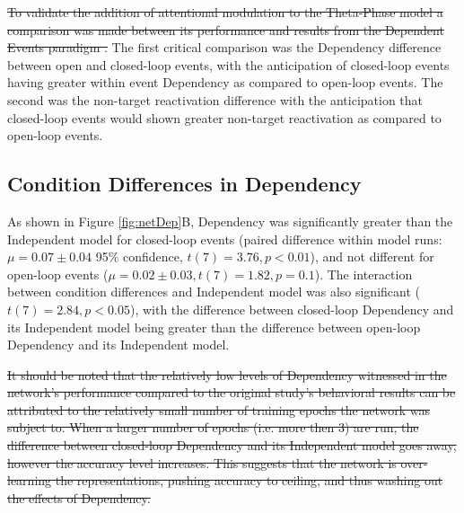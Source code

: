 \documentclass[11pt, titlepage, twoside]{article}
\providecommand{\DIFadd}[1]{{\protect\color{blue}\uwave{#1}}} %
\providecommand{\DIFdel}[1]{{\protect\color{red}\sout{#1}}}                      %
\providecommand{\DIFaddbegin}{} %
\providecommand{\DIFaddend}{} %
\providecommand{\DIFdelbegin}{} %
\providecommand{\DIFdelend}{} %
\begin{document}
\DIFdelbegin \DIFdel{To validate the addition of attentional modulation to the Theta-Phase model a comparison was made between its performance and results from the Dependent Events paradigm%
.  }\DIFdelend The first critical comparison \DIFaddbegin \DIFadd{with behavior }\DIFaddend was the Dependency difference between open and closed-loop events, with the anticipation of closed-loop events having greater within event Dependency as compared to open-loop events.  The second was the non-target reactivation difference with the anticipation that closed-loop events would shown greater non-target reactivation as compared to open-loop events.

\subsection{Condition Differences in Dependency}
As shown in Figure \ref{fig:netDep}B, Dependency was significantly greater than the Independent model for closed-loop events (paired difference within model runs: $\mu=0.07\pm0.04$ 95\% confidence, $t(7)=3.76,p<0.01$), and not different for open-loop events ($\mu=0.02\pm0.03, t(7)=1.82,p=0.1$).  The interaction between condition differences and Independent model was also significant ($t(7)=2.84,p<0.05$), with the difference between closed-loop Dependency and its Independent model being greater than the difference between open-loop Dependency and its Independent model.

\DIFdelbegin \DIFdel{It should be noted that the relatively low levels of Dependency witnessed in the network's performance compared to the original study's behavioral results %
can be attributed to the relatively small number of training epochs the network was subject to.  When a larger number of epochs (i.e. more then 3) are run, the difference between closed-loop Dependency and its Independent model goes away, however the accuracy level increases.  This suggests that the network is over-learning the representations, pushing accuracy to ceiling, and thus washing out the effects of Dependency.
}\DIFdelend %
\end{document}
